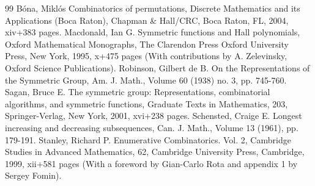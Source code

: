 \begin{thebibliography}{99}
 Bóna, Miklós Combinatorics of permutations, Discrete Mathematics and its Applications (Boca Raton), Chapman \& Hall/CRC, Boca Raton, FL, 2004, xiv+383 pages.
 Macdonald, Ian G. Symmetric functions and Hall polynomials, Oxford Mathematical Monographs, The Clarendon Press Oxford University Press, New York, 1995, x+475 pages (With contributions by A. Zelevinsky, Oxford Science Publications).
 Robinson, Gilbert de B. On the Representations of the Symmetric Group, Am. J. Math., Volume 60 (1938) no. 3, pp. 745-760.
 Sagan, Bruce E. The symmetric group: Representations, combinatorial algorithms, and symmetric functions, Graduate Texts in Mathematics, 203, Springer-Verlag, New York, 2001, xvi+238 pages.
 Schensted, Craige E. Longest increasing and decreasing subsequences, Can. J. Math., Volume 13 (1961), pp. 179-191.
 Stanley, Richard P. Enumerative Combinatorics. Vol. 2, Cambridge Studies in Advanced Mathematics, 62, Cambridge University Press, Cambridge, 1999, xii+581 pages (With a foreword by Gian-Carlo Rota and appendix 1 by Sergey Fomin).
\end{thebibliography}
